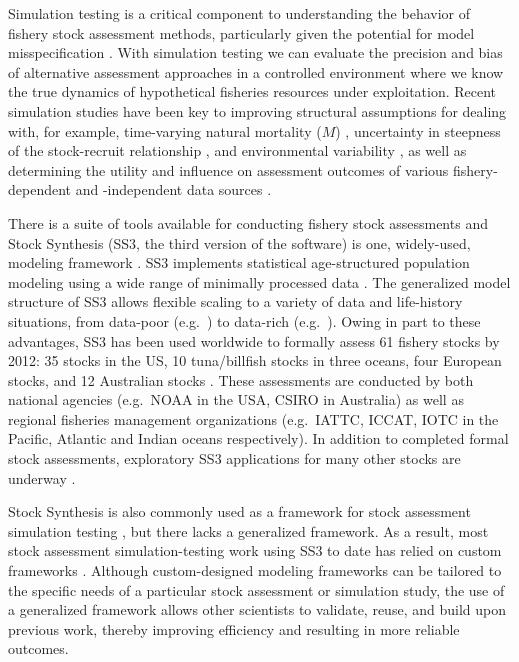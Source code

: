 Simulation testing is a critical component to understanding the behavior of
fishery stock assessment methods, particularly given the potential for model
misspecification \cite{hilborn1987, hilborn1992, rosenberg1994, peterman2004,
  deroba2014}. With simulation testing we can evaluate the precision and bias
of alternative assessment approaches in a controlled environment where we know
the true dynamics of hypothetical fisheries resources under exploitation.
Recent simulation studies have been key to improving structural
assumptions for dealing with, for example, time-varying natural mortality ($M$)
\cite{lee2011, jiao2012, deroba2013, johnson2014}, uncertainty in
steepness of the stock-recruit relationship \cite{lee2012}, and environmental
variability \cite{schirripa2009}, as well as determining the utility and
influence on assessment outcomes of various fishery-dependent and -independent
data sources \cite{magnusson2007, wetzel2011a, ono2014, yin2004}.

There is a suite of tools available for conducting fishery stock
assessments and Stock Synthesis (SS3, the third version of the software) is
one, widely-used, modeling framework \cite{methot2013}. SS3 implements
statistical age-structured population modeling using a wide range of minimally
processed data \cite{maunder2013, methot2013}. The generalized model
structure of SS3 allows flexible scaling to a variety of data and life-history
situations, from data-poor (e.g.~\cite{wetzel2011a, cope2013}) to
data-rich (e.g.~\cite{haltuch2013}). Owing in part to these advantages,
SS3 has been used worldwide to formally assess 61 fishery stocks by 2012:
35 stocks in the US, 10 tuna/billfish stocks in three oceans, four European
stocks, and 12 Australian stocks \cite{methot2013}. These assessments are
conducted by both national agencies (e.g.~NOAA in the USA, CSIRO in Australia)
as well as regional fisheries management organizations (e.g.~IATTC, ICCAT, IOTC
in the Pacific, Atlantic and Indian oceans respectively). In addition to
completed formal stock assessments, exploratory SS3 applications for many other
stocks are underway \cite{methot2013}.

Stock Synthesis is also commonly used as a framework for stock assessment
simulation testing \cite{helu2000, yin2004, schirripa2009, lee2011, jiao2012,
  lee2012, crone2013a, hurtadoferro2013}, but there lacks a generalized
framework. As a result, most stock assessment simulation-testing work using SS3
to date has relied on custom frameworks \cite{helu2000, yin2004, magnusson2007,
  wetzel2011a, jiao2012, wilberg2006, deroba2013, deroba2014, crone2013a,
  hurtadoferro2013}. Although custom-designed modeling frameworks can
be tailored to the specific needs of a particular stock assessment or
simulation study, the use of a generalized framework allows other scientists to
validate, reuse, and build upon previous work, thereby improving efficiency and
resulting in more reliable outcomes.

